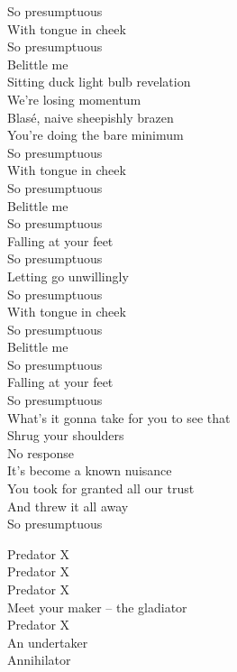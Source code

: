 So presumptuous \\
With tongue in cheek \\
So presumptuous \\
Belittle me \\

Sitting duck light bulb revelation \\
We're losing momentum \\
Blasé, naive sheepishly brazen \\
You're doing the bare minimum \\

So presumptuous \\
With tongue in cheek \\
So presumptuous \\
Belittle me \\
So presumptuous \\
Falling at your feet \\
So presumptuous \\
Letting go unwillingly \\

So presumptuous \\
With tongue in cheek \\
So presumptuous \\
Belittle me \\
So presumptuous \\
Falling at your feet \\
So presumptuous \\
What's it gonna take for you to see that \\

Shrug your shoulders \\
No response \\
It's become a known nuisance \\
You took for granted all our trust \\
And threw it all away \\
So presumptuous \\




Predator X \\
Predator X \\
Predator X \\
Meet your maker -- the gladiator \\
Predator X \\
An undertaker \\
Annihilator \\

